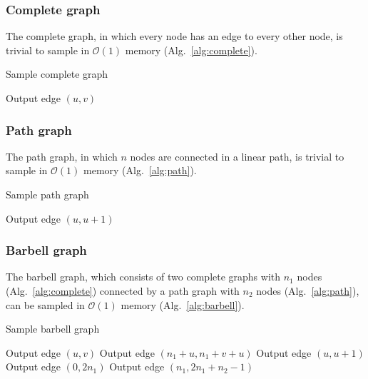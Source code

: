 \documentclass[a4paper,num-refs,gigabyte]{oup-contemporary}
\begin{document}
\subsubsection{Complete graph}
The complete graph, in which every node has an edge to every other node, is trivial to sample in $\mathcal{O}\left(1\right)$ memory (Alg.~\ref{alg:complete}).

\begin{algorithm}[H]
\caption{Sample complete graph}
\label{alg:complete}
\begin{algorithmic}
      \State Output edge $\left(u,v\right)$
    \EndFor
  \EndFor
\EndProcedure
\end{algorithmic}
\end{algorithm}

\subsubsection{Path graph}
The path graph, in which $n$ nodes are connected in a linear path, is trivial to sample in $\mathcal{O}\left(1\right)$ memory (Alg.~\ref{alg:path}).

\begin{algorithm}[H]
\caption{Sample path graph}
\label{alg:path}
\begin{algorithmic}
    \State Output edge $\left(u,u+1\right)$
  \EndFor
\EndProcedure
\end{algorithmic}
\end{algorithm}

\subsubsection{Barbell graph}
The barbell graph, which consists of two complete graphs with $n_1$ nodes (Alg.~\ref{alg:complete}) connected by a path graph with $n_2$ nodes (Alg.~\ref{alg:path}), can be sampled in $\mathcal{O}\left(1\right)$ memory (Alg.~\ref{alg:barbell}).

\begin{algorithm}[H]
\caption{Sample barbell graph}
\label{alg:barbell}
\begin{algorithmic}
      \State Output edge $\left(u,v\right)$
      \State Output edge $\left(n_1+u,n_1+v+u\right)$
    \EndFor
  \EndFor
    \State Output edge $\left(u,u+1\right)$
  \EndFor
  \State Output edge $\left(0,2n_1\right)$
  \State Output edge $\left(n_1,2n_1+n_2-1\right)$
\EndProcedure
\end{algorithmic}
\end{algorithm}
\end{document}
